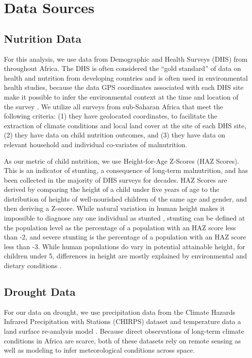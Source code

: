 \documentclass{article}
\begin{document}
\section{Data Sources}

\subsection{Nutrition Data}

For this analysis, we use data from Demographic and Health Surveys (DHS) from throughout Africa.  The DHS is often considered the ``gold standard'' of data on health and nutrition from developing countries and is often used in environmental health studies, because the data GPS coordinates associated with each DHS site make it possible to infer the environmental context at the time and location of the survey \cite{Brown2014}.  We utilize all surveys from sub-Saharan Africa that meet the following criteria: (1) they have geolocated coordinates, to facilitate the extraction of climate conditions and local land cover at the site of each DHS site, (2) they have data on child nutrition outcomes, and (3) they have data on relevant household and individual co-variates of malnutrition.

As our metric of child nutrition, we use Height-for-Age Z-Scores (HAZ Scores).  This is an indicator of stunting, a consequence of long-term malnutrition, and has been collected in the majority of DHS surveys for decades.  HAZ Scores are derived by comparing the height of a child under five years of age to the distribution of heights of well-nourished children of the same age and gender, and then deriving a Z-score.  While natural variation in human height makes it impossible to diagnose any one individual as stunted \cite{Perumal2018}, stunting can be defined at the population level as the percentage of a population with an HAZ score less than -2, and severe stunting is the percentage of a population with an HAZ score less than -3.  While human populations do vary in potential attainable height, for children under 5, differences in height are mostly explained by environmental and dietary conditions \cite{Habicht1974}.

\subsection{Drought Data}
For our data on drought, we use precipitation data from the Climate Hazards Infrared Precipitation with Stations (CHIRPS) dataset \cite{Funk2015} and temperature data a land surface re-analysis model \cite{Sheffield2006}.  Because direct observations of long-term climate conditions in Africa are scarce, both of these datasets rely on remote sensing as well as modeling to infer meteorological conditions across space.
\end{document}
